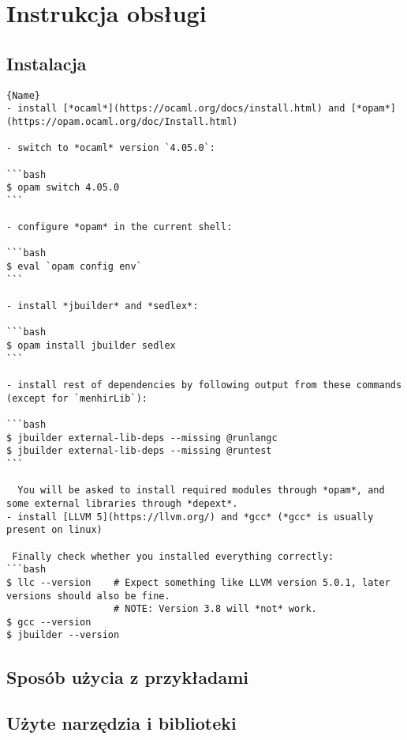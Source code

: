 \documentclass[declaration,shortabstract]{iithesis}
\begin{document}

\chapter{Instrukcja obsługi}

\section{Instalacja}

\begin{lstlisting}[caption=Instancja klasy w OCamlu, frame=tlrb]{Name}
- install [*ocaml*](https://ocaml.org/docs/install.html) and [*opam*](https://opam.ocaml.org/doc/Install.html)

- switch to *ocaml* version `4.05.0`:

```bash
$ opam switch 4.05.0
```

- configure *opam* in the current shell:

```bash
$ eval `opam config env`
```

- install *jbuilder* and *sedlex*:

```bash
$ opam install jbuilder sedlex
```

- install rest of dependencies by following output from these commands (except for `menhirLib`):

```bash
$ jbuilder external-lib-deps --missing @runlangc
$ jbuilder external-lib-deps --missing @runtest
```

  You will be asked to install required modules through *opam*, and some external libraries through *depext*.
- install [LLVM 5](https://llvm.org/) and *gcc* (*gcc* is usually present on linux)

 Finally check whether you installed everything correctly:
```bash
$ llc --version    # Expect something like LLVM version 5.0.1, later versions should also be fine.
                   # NOTE: Version 3.8 will *not* work.
$ gcc --version
$ jbuilder --version
\end{lstlisting}

\section{Sposób użycia z przykładami}

\section{Użyte narzędzia i biblioteki}
\end{document}
